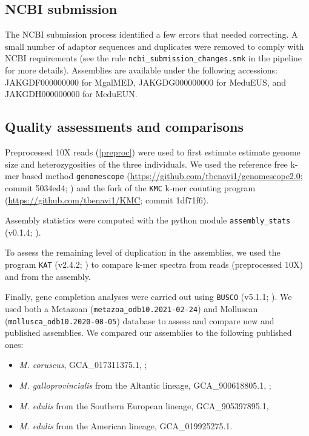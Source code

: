 \documentclass[11pt, a4paper]{article}
\begin{document}
\subsection{NCBI submission}

The NCBI submission process identified a few errors that needed correcting.
A small number of adaptor sequences and duplicates were removed to comply with NCBI requirements
(see the rule \texttt{ncbi\_submission\_changes.smk} in the pipeline for more details).
Assemblies are available under the following accessions: 
JAKGDF000000000 for MgalMED,
JAKGDG000000000 for MeduEUS,
and JAKGDH000000000 for MeduEUN.


\subsection{Quality assessments and comparisons}

Preprocessed 10X reads (\cref{preproc}) were used to first estimate estimate genome size and heterozygosities of the three individuals.
We used the reference free k-mer based method \texttt{genomescope} (\url{https://github.com/tbenavi1/genomescope2.0}; commit 5034ed4; \cite{Ranallo-Benavidez2020}) and the fork of the \texttt{KMC} k-mer  counting program (\url{https://github.com/tbenavi1/KMC}; commit 1df71f6).

Assembly statistics were computed with the python module \texttt{assembly\_stats} (v0.1.4; \cite{Trizna2020}).

To assess the remaining level of duplication in the assemblies, we used the program \texttt{KAT} (v2.4.2; \cite{Mapleson2017}) to compare k-mer spectra from reads (preprocessed 10X) and from the assembly.

Finally, gene completion analyses were carried out using \texttt{BUSCO} (v5.1.1; \cite{Manni2021}).
We used both a Metazoan (\texttt{metazoa\_odb10.2021-02-24}) and Molluscan (\texttt{mollusca\_odb10.2020-08-05}) database to assess and compare new and published assemblies.
We compared our assemblies to the following published ones:
\begin{itemize}
	\item \textit{M. coruscus}, GCA\_017311375.1, \textcite{Yang2021};
	\item \textit{M. galloprovincialis} from the Altantic lineage, GCA\_900618805.1, \textcite{Gerdol2020};
	\item \textit{M. edulis} from the Southern European lineage, GCA\_905397895.1, \textcite{Corrochano-Fraile2021}
	\item \textit{M. edulis} from the American lineage, GCA\_019925275.1.
\end{itemize}
\end{document}
